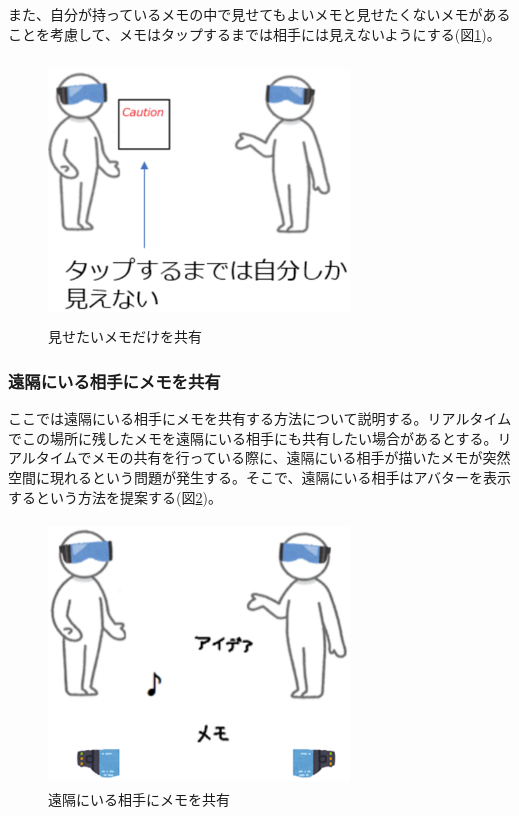 \documentclass[11pt,a4j, titlepage]{jarticle} %
\begin{document}
また、自分が持っているメモの中で見せてもよいメモと見せたくないメモがあることを考慮して、メモはタップするまでは相手には見えないようにする(図\ref{fig:sharing_taimen2})。

\begin{figure}[H]
  \begin{center}
    \includegraphics[clip,height=7.0cm,width=8.0cm]{./sharing_taimen2.eps}
    \caption{見せたいメモだけを共有}
    \label{fig:sharing_taimen2}
  \end{center}
\end{figure}

\subsubsection{遠隔にいる相手にメモを共有}
ここでは遠隔にいる相手にメモを共有する方法について説明する。リアルタイムでこの場所に残したメモを遠隔にいる相手にも共有したい場合があるとする。リアルタイムでメモの共有を行っている際に、遠隔にいる相手が描いたメモが突然空間に現れるという問題が発生する。そこで、遠隔にいる相手はアバターを表示するという方法を提案する(図\ref{fig:sharing_enkaku})。

\begin{figure}[H]
  \begin{center}
    \includegraphics[clip,height=7.0cm,width=8.0cm]{./sharing_enkaku.eps}
    \caption{遠隔にいる相手にメモを共有}
    \label{fig:sharing_enkaku}
  \end{center}
\end{figure}
\end{document}
